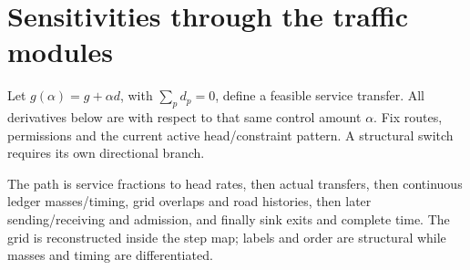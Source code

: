 \documentclass[10pt,a4paper]{article}
\begin{document}
\section{Sensitivities through the traffic modules}
Let $g(\alpha)=g+\alpha d$, with $\sum_p d_p=0$, define a feasible
service transfer. All derivatives below are with respect to that same
control amount $\alpha$. Fix routes, permissions and the current active
head/constraint pattern. A structural switch requires its own directional
branch.

The path is service fractions to head rates, then actual transfers, then
continuous ledger masses/timing, grid overlaps and road histories, then
later sending/receiving and admission, and finally sink exits and complete
time. The grid is reconstructed inside the step map; labels and order are
structural while masses and timing are differentiated.
\end{document}
